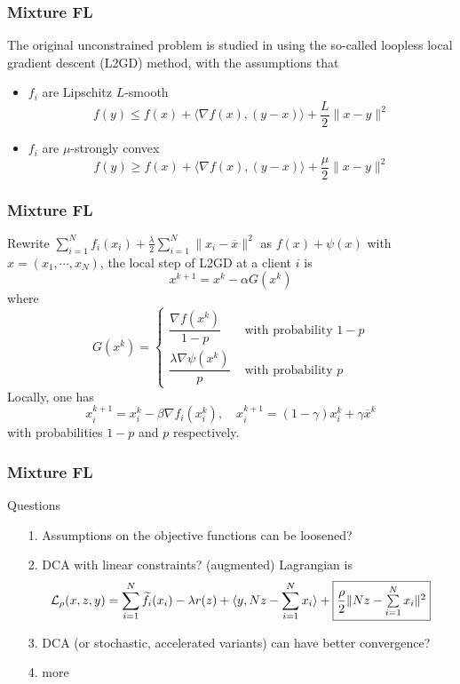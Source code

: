 
\begin{frame}
\frametitle{Mixture FL}

The original unconstrained problem is studied in \cite{hanzely2020federated} using the so-called loopless local gradient descent (L2GD) method, with the assumptions that
\begin{itemize}
    \item $f_i$ are Lipschitz $L$-smooth
    $$f(y) \leqslant f(x) + \langle \nabla f(x), (y-x)\rangle + \dfrac{L}{2} \lVert x-y \rVert^2$$
    \item $f_i$ are $\mu$-strongly convex
    $$f(y) \geqslant f(x) + \langle \nabla f(x), (y-x)\rangle + \dfrac{\mu}{2} \lVert x-y \rVert^2$$
\end{itemize}

\end{frame}


\begin{frame}
\frametitle{Mixture FL}

Rewrite $\sum\limits_{i=1}^N f_i(x_i) + \frac{\lambda}{2} \sum\limits_{i=1}^N \lVert x_i - \overline{x} \rVert^2$ as $f(x) + \psi(x)$ with $x = (x_1,\cdots,x_N)$, the local step of L2GD at a client $i$ is
$$x^{k+1} = x^k - \alpha G(x^k)$$
where
$$
G(x^k) = \begin{cases}
\dfrac{\nabla f(x^k)}{1-p} & \text{ with probability } 1-p \\
\dfrac{\lambda \nabla \psi(x^k)}{p} & \text{ with probability } p 
\end{cases}
$$
Locally, one has
$$x_i^{k+1} = x_i^k - \beta \nabla f_i(x_i^k), \quad x_i^{k+1} = (1-\gamma)x_i^k + \gamma \overline{x}^k$$
with probabilities $1-p$ and $p$ respectively.

\end{frame}


\begin{frame}
\frametitle{Mixture FL}

\begin{block}{Questions}
\begin{itemize}
    \item[1.] Assumptions on the objective functions can be loosened?
    \item[2.] DCA with linear constraints? (augmented) Lagrangian is
    {\scriptsize
    $$\mathcal{L}_{\rho}(x,z,y) = \sum\limits_{i=1}^N \widetilde{f}_i(x_i) - \lambda r(z) + \langle y, Nz - \sum\limits_{i=1}^N x_i \rangle + \framebox{$\dfrac{\rho}{2} \lVert Nz - \sum\limits_{i=1}^N x_i \rVert^2$} $$
    }
    \item[3.] DCA (or stochastic, accelerated variants) can have better convergence?
    \item[4.] more
\end{itemize}
\end{block}

\end{frame}



